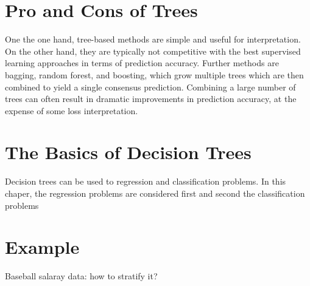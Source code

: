 \documentclass[]{report}
\newenvironment{Shaded}{\begin{snugshade}}{\end{snugshade}}
\newcommand{\KeywordTok}[1]{\textcolor[rgb]{0.13,0.29,0.53}{\textbf{#1}}}
\newcommand{\DataTypeTok}[1]{\textcolor[rgb]{0.13,0.29,0.53}{#1}}
\newcommand{\StringTok}[1]{\textcolor[rgb]{0.31,0.60,0.02}{#1}}
\newcommand{\OperatorTok}[1]{\textcolor[rgb]{0.81,0.36,0.00}{\textbf{#1}}}
\newcommand{\NormalTok}[1]{#1}
\begin{document}
\section{Pro and Cons of Trees}\label{pro-and-cons-of-trees}

One the one hand, tree-based methods are simple and useful for
interpretation. On the other hand, they are typically not competitive
with the best supervised learning approaches in terms of prediction
accuracy. Further methods are bagging, random forest, and boosting,
which grow multiple trees which are then combined to yield a single
consensus prediction. Combining a large number of trees can often result
in dramatic improvements in prediction accuracy, at the expense of some
loss interpretation.

\section{The Basics of Decision
Trees}\label{the-basics-of-decision-trees}

Decision trees can be used to regression and classification problems. In
this chaper, the regression problems are considered first and second the
classification problems

\section{Example}\label{example}

Baseball salaray data: how to stratify it?

\begin{Shaded}
\end{Shaded}
\end{document}
